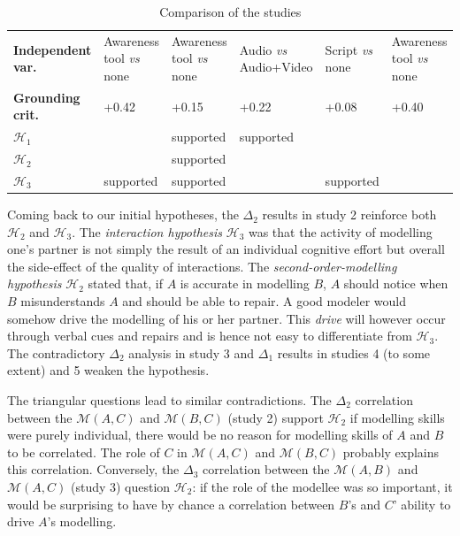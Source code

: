 \documentclass[natbib]{svjour3}
\newcommand{\gmodel}[2]{{$\mathcal{M}(#1, #2)$}}
\begin{document}
\begin{table}[ht!]
{\begin{tabular}{p{2.6cm}|p{3.5cm}|p{3.5cm}|p{3.5cm}|p{3.5cm}|p{3.5cm}}
\textbf{Independent var.}     & Awareness tool \textit{vs} none  & Awareness tool \textit{vs} none & Audio \textit{vs} Audio+Video & Script \textit{vs} none & Awareness tool \textit{vs} none       \\
\textbf{Grounding crit.}      & +0.42                            & +0.15                           & +0.22                     & +0.08                     & +0.40                        \\
$\mathcal{H}_1$               &                                  & supported                       & supported                 &                           &                              \\
$\mathcal{H}_2$               &                                  & supported&                         &                           &                              \\
$\mathcal{H}_3$               & supported                        & supported                       &                           & supported                 &                              \\
\end{tabular}
}
\caption{Comparison of the studies}
\label{synthesis_table}
\end{table}

Coming back to our initial hypotheses, the $\Delta_2$ results in study 2
reinforce both $\mathcal{H}_{2}$ and $\mathcal{H}_{3}$. The \emph{interaction
hypothesis} $\mathcal{H}_{3}$ was that the activity of modelling one's partner
is not simply the result of an individual cognitive effort but overall the
side-effect of the quality of interactions. The \emph{second-order-modelling
hypothesis} $\mathcal{H}_{2}$ stated that, if $A$ is accurate in modelling $B$,
$A$ should notice when $B$ misunderstands $A$ and should be able to repair. A
good modeler would somehow drive the modelling of his or her partner.  This
\emph{drive} will however occur through verbal cues and repairs and is hence not
easy to differentiate from $\mathcal{H}_{3}$. The contradictory $\Delta_2$
analysis in study 3 and $\Delta_1$ results in studies 4 (to some extent) and 5
weaken the hypothesis.

The triangular questions lead to similar contradictions. The $\Delta_2$
correlation between the \gmodel{A}{C} and \gmodel{B}{C} (study 2)
support $\mathcal{H}_{2}$ if modelling skills were purely individual, there would
be no reason for modelling skills of $A$ and $B$ to be correlated.  The role of $C$ in
\gmodel{A}{C} and \gmodel{B}{C} probably explains this correlation.  Conversely,
the $\Delta_3$ correlation between the \gmodel{A}{B} and \gmodel{A}{C} (study
3) question $\mathcal{H}_{2}$: if the role of the modellee was so
important, it would be surprising to have by chance a correlation between
$B$'s and $C$' ability to drive $A$'s modelling.
\end{document}
